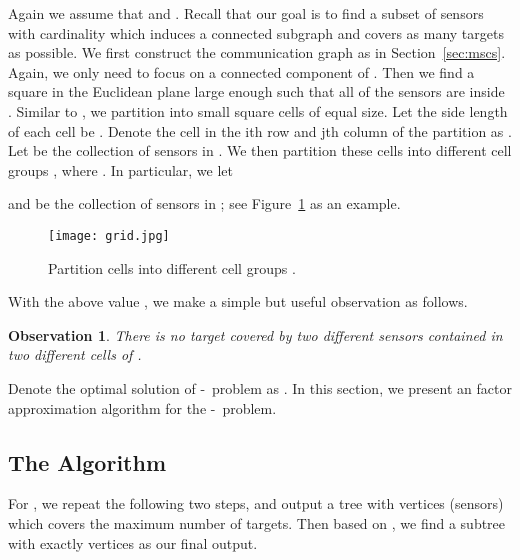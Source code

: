 \documentclass[11pt]{article}
\newcommand{\bcsc}{-}
\newtheorem{observation}{Observation}
\begin{document}
Again we assume that  and .
Recall that our goal is to find a subset 
of sensors with cardinality  which induces a connected subgraph and
covers as many targets as possible.
We first construct the communication graph  as in Section~\ref{sec:mscs}.
Again, we only need to focus on a connected component of .
Then we find a square  in the Euclidean plane large enough such that all of the  sensors are inside .
Similar to \cite{marathe1995simple,hunt1998nc}, we partition  into small square cells of equal size.
Let the side length of each cell be .
Denote the cell in the ith row and jth column of the partition as .
Let  be the collection of sensors in .
We then partition these cells into  different cell groups
,
where .
In particular, we let

and
 be the collection of sensors in ; see Figure~\ref{fig:grid} as an example.
\begin{figure}
	\label{fig:grid}
	\caption{Partition cells into  different cell groups .}
	\centering
	\texttt{[image: grid.jpg]}
\end{figure}

With the above value , we make a simple but useful observation as follows.
\begin{observation}
	\label{ob:nodoublecover}
	There is no target covered by two different sensors contained in two different cells of .
\end{observation}
Denote the optimal solution of \bcsc\ problem as .
In this section, we present an  factor approximation algorithm
for the \bcsc\ problem.

\subsection{The Algorithm}
For , we repeat the following two steps,
and output a tree  with  vertices (sensors) which covers the maximum number of targets.
Then based on , we find a subtree  with exactly  vertices as our final output.
\end{document}
